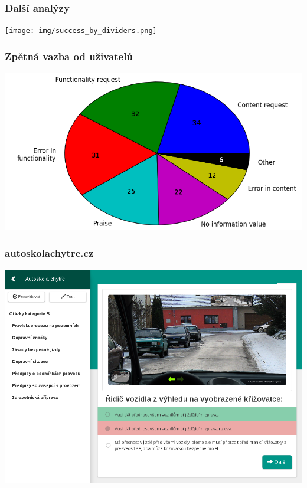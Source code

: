 \documentclass[xcolor=svgnames]{beamer}
\begin{document}
\begin{frame}
	\frametitle{Další analýzy}
   \texttt{[image: img/success\_by\_dividers.png]}
\end{frame}
\begin{frame}
	\frametitle{Zpětná vazba od uživatelů}
   \includegraphics[width=\textwidth]{img/feedback_by_type.png}
\end{frame}
\begin{frame}
	\frametitle{autoskolachytre.cz}
	 
   \includegraphics[width=\textwidth]{img/autoskola.png}
\end{frame}
\end{document}
